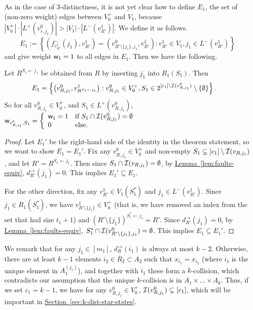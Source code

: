 \documentclass{theoretics}
\renewcommand{\sec}[1]{\hyperref[sec:#1]{Section~\ref*{sec:#1}}}
\newcommand{\lem}[1]{\hyperref[lem:#1]{Lemma~\ref*{lem:#1}}}
\renewcommand{\>}{\rangle}
\newcommand{\<}{\langle}
\renewcommand{\(}{\left(}
\renewcommand{\)}{\right)}
\def\w{{\sf w}}
\begin{document}
As in the case of 3-distinctness, it is not yet clear how to define $E_1$, the set of (non-zero weight) edges between $V_0^+$ and $V_1$, because $|V_0^+|\cdot |L^+(v_{r,j_1}^0)| > |V_1|\cdot |L^-(v_{R'}^1)|$.  We define it as follows.
$$E_1:=\left\{\left(f^-_{v_{R'}^1}(j_1),v_{R'}^1\right)=\left(v_{R'\setminus\{j_1\},j_1}^0,v_{R'}^1\right):v_{R'}^1\in V_1,j_1\in L^-(v_{R'}^1)\right\}$$
and give weight $\w_1=1$ to all edges in $E_1$. Then we have the following.
\begin{lemma}\label{lem:k-dist-E1}
Let $R^{S_1 \leftarrow j_1}$ be obtained from $R$ by inserting $j_1$ into $R_1(S_1)$. Then
\begin{align*}
E_1 &= \left\{\left(v^{0}_{R,j_1},v^{1}_{R^{S_1 \leftarrow j_1}}\right): v_{R,j_1}^0\in V_0^+, S_1 \in 2^{[c_{1}]\setminus {\cal I}(v_{R,j_1}^0)}\setminus \{\emptyset\} \right\}.\label{eq:k-dist-E1}
\end{align*}
So for all $v^0_{R,j_1}\in V_0^+$, and $S_1\in L^+(v^0_{R,j_1})$,
$\displaystyle\w_{v^0_{R,j_1},S_1} = \left\{\begin{array}{ll}
\w_1 =1 & \mbox{if }S_1\cap {\cal I}(v^0_{R,j_1}) = \emptyset\\
0 & \mbox{else.}
\end{array}\right.$
\end{lemma}
\begin{proof}
Let $E_1'$ be the right-hand side of the identity in the theorem statement, so we want to show $E_1=E_1'$. 
Fix any $v_{R,j_1}^0\in V_0^+$ and non-empty $S_1\subseteq [c_1]\setminus {\cal I}(v_{R,j_1})$, and let $R'=R^{S_1\leftarrow j_1}$. Then since $S_1\cap {\cal I}(v_{R,j_1})=\emptyset$, by \lem{faults-equiv}, $d^{\rightarrow}_{R'}(j_1)=0$.
This implies $E_1'\subseteq E_1$.

For the other direction, fix any $v^1_{R'}\in V_1(S_1^*)$ and $j_1\in L^-(v^1_{R'})$. Since $j_1\in R_1(S_1^*)$, we have $v^1_{R'\setminus\{j_1\}}\in V_0^+$ (that is, we have removed an index from the set that had size $t_1+1$) and $(R'\setminus\{j_1\})^{S_1^*\leftarrow j_1}=R'$. Since $d_{R'}^{\rightarrow}(j_1)=0$, by \lem{faults-equiv}, $S_1^*\cap {\cal I}(v_{R'\setminus\{j_1\},j_1}^0)=\emptyset$. This implies $E_1\subseteq E_1'$.
\end{proof}

We remark that for any $j_1\in [m_1]$, $d_R^{\rightarrow}(i_1)$ is always at most $k-2$. Otherwise, there are at least $k-1$ elements $i_2\in \overline{R}_2\subset A_2$ such that $x_{i_1}=x_{i_2}$ (where $i_1$ is the unique element in $A_1^{(j_1)}$), and together with $i_1$ these form a $k$-collision, which contradicts our assumption that the unique $k$-collision is in $A_1\times\dots\times A_k$. Thus, if we set $c_1=k-1$, we have for any $v_{R,j_1}^0\in V_0^+$, ${\cal I}(v_{R,j_1}^0)\subsetneq [c_1]$, which will be important in \sec{k-dist-star-states}.
\end{document}
